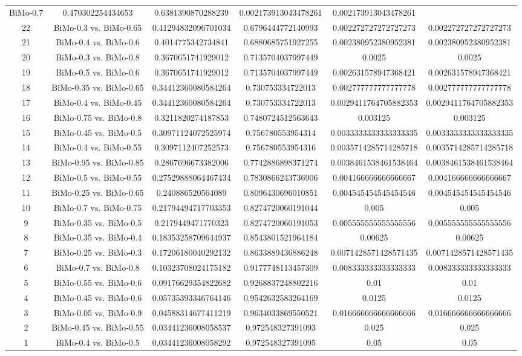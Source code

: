 \documentclass[a4paper,10pt]{article}
\begin{document}
\begin{landscape}
\begin{table}[!htp]
\begin{tabular}{cccccc}
BiMo-0.7&0.470302254434653&0.6381390870288239&0.002173913043478261&0.002173913043478261\\22&BiMo-0.3 vs. BiMo-0.65&0.41294832096701034&0.6796444772140993&0.002272727272727273&0.002272727272727273\\21&BiMo-0.4 vs. BiMo-0.6&0.4014775342734841&0.6880685751927255&0.002380952380952381&0.002380952380952381\\20&BiMo-0.3 vs. BiMo-0.8&0.3670651741929012&0.7135704037997449&0.0025&0.0025\\19&BiMo-0.5 vs. BiMo-0.6&0.3670651741929012&0.7135704037997449&0.002631578947368421&0.002631578947368421\\18&BiMo-0.35 vs. BiMo-0.65&0.34412360080584264&0.730753334722013&0.002777777777777778&0.002777777777777778\\17&BiMo-0.4 vs. BiMo-0.45&0.34412360080584264&0.730753334722013&0.0029411764705882353&0.0029411764705882353\\16&BiMo-0.75 vs. BiMo-0.8&0.3211820274187853&0.7480724512563643&0.003125&0.003125\\15&BiMo-0.45 vs. BiMo-0.5&0.30971124072525974&0.756780553954314&0.0033333333333333335&0.0033333333333333335\\14&BiMo-0.4 vs. BiMo-0.55&0.3097112407252573&0.756780553954316&0.0035714285714285718&0.0035714285714285718\\13&BiMo-0.95 vs. BiMo-0.85&0.2867696673382006&0.7742886898371274&0.0038461538461538464&0.0038461538461538464\\12&BiMo-0.5 vs. BiMo-0.55&0.27529888064467434&0.7830866243736906&0.004166666666666667&0.004166666666666667\\11&BiMo-0.25 vs. BiMo-0.65&0.240886520564089&0.8096430696010851&0.004545454545454546&0.004545454545454546\\10&BiMo-0.7 vs. BiMo-0.75&0.21794494717703353&0.8274720060191044&0.005&0.005\\9&BiMo-0.35 vs. BiMo-0.5&0.2179449471770323&0.8274720060191053&0.005555555555555556&0.005555555555555556\\8&BiMo-0.35 vs. BiMo-0.4&0.18353258709644937&0.8543801521964184&0.00625&0.00625\\7&BiMo-0.25 vs. BiMo-0.3&0.17206180040292132&0.8633889436886248&0.0071428571428571435&0.0071428571428571435\\6&BiMo-0.7 vs. BiMo-0.8&0.10323708024175182&0.9177748113457309&0.008333333333333333&0.008333333333333333\\5&BiMo-0.55 vs. BiMo-0.6&0.09176629354822682&0.9268837248802216&0.01&0.01\\4&BiMo-0.45 vs. BiMo-0.6&0.05735393346764146&0.9542632583264169&0.0125&0.0125\\3&BiMo-0.05 vs. BiMo-0.9&0.04588314677411219&0.9634033869550521&0.016666666666666666&0.016666666666666666\\2&BiMo-0.45 vs. BiMo-0.55&0.03441236008058537&0.972548327391093&0.025&0.025\\1&BiMo-0.4 vs. BiMo-0.5&0.03441236008058292&0.972548327391095&0.05&0.05\\\hline

\end{tabular}
\end{table}
\end{landscape}
\end{document}
